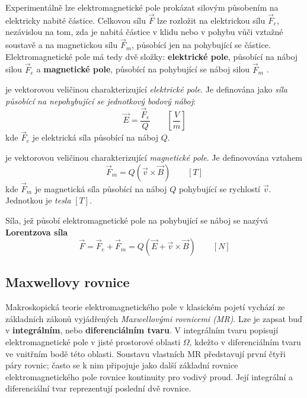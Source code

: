 {       Experimentálně lze elektromagnetické pole prokázat silovým působením na elektricky nabité
       částice. Celkovou sílu $\vec{F}$ lze rozložit na elektrickou sílu $\vec{F}_e$, nezávislou na
       tom, zda je nabitá částice v klidu nebo v pohybu vůči vztažné soustavě a na magnetickou sílu
       $\vec{F}_m$, působící jen na pohybující se částice. Elektromagnetické pole má tedy dvě
       složky: \textbf{elektrické pole}, působící na náboj silou $\vec{F}_e$ a \textbf{magnetické
       pole}, působící na pohybující se náboj silou $\vec{F}_m$  \cite[s.~13]{Mayer2001}.
      
      \vspace{1em}
       je vektorovou veličinou charakterizující
        \emph{elektrické pole}.
        Je definována jako 
        \emph{síla působící na nepohybující se jednotkový bodový náboj}:
        \begin{equation}\label{TEMP:eq_E}
          \vec{E} = \frac{\vec{F}_e}{Q} \qquad\left[\frac{V}{m}\right]  
        \end{equation}        
        kde $\vec{F}_e$ je elektrická síla působící na náboj $Q$.
      
      \vspace{1em}
       je vektorovou veličinou charakterizující \emph{magnetické
        pole}. Je definovována vztahem
        \begin{equation}\label{TEMP:eq_B}
          \vec{F}_m = Q(\vec{v}\times\vec{B}) \qquad[T]  
        \end{equation}        
        kde $\vec{F}_m$ je magnetická síla působící na náboj $Q$ pohybující se rychlostí $\vec{v}$.
        Jednotkou je \emph{tesla} $[T]$.
    
        Síla, jež působí elektromagnetické pole na pohybující se náboj se nazývá \textbf{Lorentzova
        síla}
        \begin{equation}\label{TEMP:eq_Lorentz}
          \vec{F} = \vec{F}_e + \vec{F}_m =Q(\vec{E} + \vec{v}\times\vec{B}) \qquad[N]  
        \end{equation}        

    \subsection{Maxwellovy rovnice}
      Makroskopická teorie elektromagnetického pole v klasickém pojetí vychází ze základních zákonů
      vyjádřených \emph{Maxwellovými rovnicemi (MR)}. Lze je zapsat buď v \textbf{integrálním},
      nebo \textbf{diferenciálním tvaru}. V integrálním tvaru popisují elektromagnetické pole v
      jisté prostorové oblasti $\Omega$, kdežto v diferenciálním tvaru ve vnitřním bodě této
      oblasti. Soustavu vlastních MR představují první čtyři páry rovnic; často se k nim připojuje
      jako další základní rovnice elektromagnetického pole rovnice kontinuity pro vodivý proud.
      Její integrální a diferenciální tvar reprezentují poslední dvě rovnice.

}
